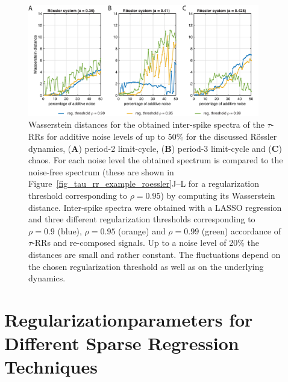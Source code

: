 \documentclass[entropy,article,accept,pdftex,moreauthors]{Definitions/mdpi}
\begin{document}
\begin{figure}[H]
 \includegraphics[width=0.9\textwidth]{./figures/fig_roessler_spectra_distances}
 \caption{Wasserstein distances for the obtained inter-spike spectra of the $\tau$-RRs for additive noise levels of up to 50\% for the discussed R\"ossler dynamics, 
 (\textbf{A}) period-2 limit-cycle, (\textbf{B}) period-3 limit-cycle and (\textbf{C}) chaos. For each noise level the obtained spectrum is compared to the noise-free spectrum (these are shown 
 in Figure~\ref{fig_tau_rr_example_roessler}J--L for a regularization threshold corresponding to $\rho=0.95$) by computing its Wasserstein distance. Inter-spike spectra were obtained with a 
 LASSO regression and three different regularization thresholds corresponding to $\rho=0.9$ (blue), $\rho=0.95$ (orange) and $\rho=0.99$ (green) accordance of $\tau$-RRs and re-composed signals. 
 Up to a noise level of 20\% the distances are small and rather constant. The fluctuations depend on the chosen regularization threshold as well as on the underlying dynamics.}
\label{fig_roessler_spectra_distances}
\end{figure}

\section{Regularizationparameters for Different Sparse Regression Techniques}\label{sec_regularization_appendix}
\end{document}
